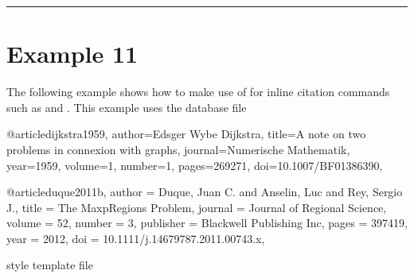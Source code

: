 \documentclass[letterpaper,10pt,english]{sphinxmanual}
\begin{document}
\bigskip\hrule\bigskip



\section{Example 11}
\label{\detokenize{examples:example-11}}
The following example shows how to make use of  for inline citation commands such as  and . This example uses the database file

%
\begin{sphinxVerbatim}[commandchars=\\\{\}]
@article\PYGZob{}dijkstra1959,
  author=\PYGZdq{}Edsger Wybe Dijkstra\PYGZdq{},
  title=\PYGZdq{}A note on two problems in connexion with graphs\PYGZdq{},
  journal=\PYGZdq{}Numerische Mathematik\PYGZdq{},
  year=\PYGZdq{}1959\PYGZdq{},
  volume=\PYGZdq{}1\PYGZdq{},
  number=\PYGZdq{}1\PYGZdq{},
  pages=\PYGZdq{}269\PYGZhy{}271\PYGZdq{},
  doi=\PYGZdq{}10.1007/BF01386390\PYGZdq{},
\PYGZcb{}

@article\PYGZob{}duque2011b,
  author = \PYGZob{}Duque, Juan C. and Anselin, Luc and Rey, Sergio J.\PYGZcb{},
  title = \PYGZob{}The Max\PYGZhy{}\PYGZdl{}p\PYGZdl{}\PYGZhy{}Regions Problem\PYGZcb{},
  journal = \PYGZob{}Journal of Regional Science\PYGZcb{},
  volume = \PYGZob{}52\PYGZcb{},
  number = \PYGZob{}3\PYGZcb{},
  publisher = \PYGZob{}Blackwell Publishing Inc\PYGZcb{},
  pages = \PYGZob{}397\PYGZhy{}\PYGZhy{}419\PYGZcb{},
  year = \PYGZob{}2012\PYGZcb{},
  doi = \PYGZob{}10.1111/j.1467\PYGZhy{}9787.2011.00743.x\PYGZcb{},
\PYGZcb{}

\end{sphinxVerbatim}

style template file
\end{document}
